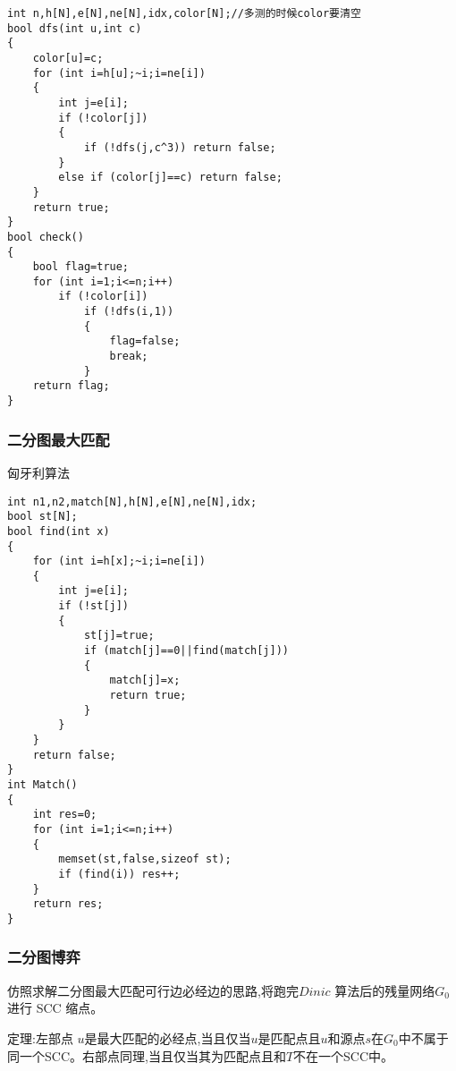 \documentclass[a4paper]{ctexart}
\begin{document}
\begin{lstlisting}
int n,h[N],e[N],ne[N],idx,color[N];//多测的时候color要清空
bool dfs(int u,int c)
{
    color[u]=c;
    for (int i=h[u];~i;i=ne[i])
    {
        int j=e[i];
        if (!color[j])
        {
            if (!dfs(j,c^3)) return false;
        }
        else if (color[j]==c) return false;
    }
    return true;
}
bool check()
{
    bool flag=true;
    for (int i=1;i<=n;i++)
        if (!color[i])
            if (!dfs(i,1))
            {
                flag=false;
                break;
            }
    return flag;
}
\end{lstlisting}

\subsubsection{二分图最大匹配}

匈牙利算法

\begin{lstlisting}
int n1,n2,match[N],h[N],e[N],ne[N],idx;
bool st[N];
bool find(int x)
{
    for (int i=h[x];~i;i=ne[i])
    {
        int j=e[i];
        if (!st[j])
        {
            st[j]=true;
            if (match[j]==0||find(match[j]))
            {
                match[j]=x;
                return true;
            }
        }
    }
    return false;
}
int Match()
{
    int res=0;
    for (int i=1;i<=n;i++)
    {
        memset(st,false,sizeof st);
        if (find(i)) res++;
    }
    return res;
}
\end{lstlisting}

\subsubsection{二分图博弈}

仿照求解二分图最大匹配可行边必经边的思路,将跑完$Dinic$ 算法后的残量网络$G_0$进行 SCC 缩点。

定理:左部点 $u$是最大匹配的必经点,当且仅当$u$是匹配点且$u$和源点$s$在$G_0$中不属于同一个SCC。右部点同理,当且仅当其为匹配点且和$T$不在一个SCC中。
\end{document}
